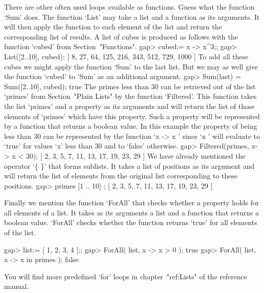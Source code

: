 There are other often used loops available as functions.   Guess what the
function `Sum' does.  The function `List' may  take a list and a function
as its arguments.  It will then apply the function to each element of the
list  and return  the corresponding list of results.   A list of cubes is
produced as follows with the function `cubed' from Section~"Functions".
\beginexample
gap> cubed:= x -> x^3;;
gap> List([2..10], cubed);
[ 8, 27, 64, 125, 216, 343, 512, 729, 1000 ] 
\endexample
To add all these cubes  we might apply the  function  `Sum' to  the  last
list.  But we may  as well  give the  function  `cubed' to  `Sum'  as  an
additional argument.
\beginexample
gap> Sum(last) = Sum([2..10], cubed);
true 
\endexample
The  primes less than 30 can  be retrieved out  of the list `primes' from
Section~"Plain Lists" by the function `Filtered'. This function takes the
list `primes' and a property as its arguments and will return the list of
those elements of `primes' which have this property. Such a property will
be represented  by  a function  that  returns  a boolean  value. In  this
example the property  of  being less than  30 can be represented  by  the
function `x  -> x ' since `x ' will evaluate to `true'  for
values `x' less than 30 and to `false' otherwise.
\beginexample
gap> Filtered(primes, x-> x < 30);
[ 2, 3, 5, 7, 11, 13, 17, 19, 23, 29 ] 
\endexample
We have already  mentioned the operator `\{  \}' that  forms sublists. It
takes a  list of positions  as its argument  and will return  the list of
elements from the original list corresponding to these positions.
\beginexample
gap> primes{ [1 .. 10] };
[ 2, 3, 5, 7, 11, 13, 17, 19, 23, 29 ] 
\endexample

Finally we mention the function `ForAll' that checks whether a property
holds for all elements of a list. It takes as its arguments  a list and a 
function that returns a boolean value. `ForAll' checks whether the
function returns `true' for all elements of the list.

\beginexample
gap> list:= [ 1, 2, 3, 4 ];;
gap> ForAll( list, x -> x > 0 );
true
gap> ForAll( list, x -> x in primes );
false
\endexample
 
You will find more predefined `for' loops in chapter~"ref:Lists" of the
reference manual.



